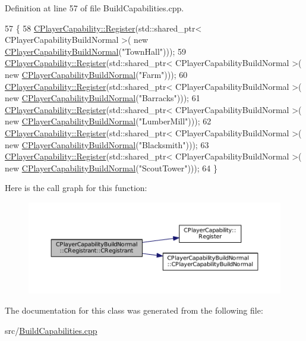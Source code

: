 Definition at line 57 of file Build\+Capabilities.\+cpp.


\begin{DoxyCode}
57                                                     \{
58     \hyperlink{classCPlayerCapability_a7e298018dcde2684451add3cfff065f7}{CPlayerCapability::Register}(std::shared\_ptr< CPlayerCapabilityBuildNormal >(\textcolor{keyword}{
      new} \hyperlink{classCPlayerCapabilityBuildNormal_a36157bf1a2875f0831b646dd2313a464}{CPlayerCapabilityBuildNormal}(\textcolor{stringliteral}{"TownHall"})));   
59     \hyperlink{classCPlayerCapability_a7e298018dcde2684451add3cfff065f7}{CPlayerCapability::Register}(std::shared\_ptr< CPlayerCapabilityBuildNormal >(\textcolor{keyword}{
      new} \hyperlink{classCPlayerCapabilityBuildNormal_a36157bf1a2875f0831b646dd2313a464}{CPlayerCapabilityBuildNormal}(\textcolor{stringliteral}{"Farm"})));
60     \hyperlink{classCPlayerCapability_a7e298018dcde2684451add3cfff065f7}{CPlayerCapability::Register}(std::shared\_ptr< CPlayerCapabilityBuildNormal >(\textcolor{keyword}{
      new} \hyperlink{classCPlayerCapabilityBuildNormal_a36157bf1a2875f0831b646dd2313a464}{CPlayerCapabilityBuildNormal}(\textcolor{stringliteral}{"Barracks"})));   
61     \hyperlink{classCPlayerCapability_a7e298018dcde2684451add3cfff065f7}{CPlayerCapability::Register}(std::shared\_ptr< CPlayerCapabilityBuildNormal >(\textcolor{keyword}{
      new} \hyperlink{classCPlayerCapabilityBuildNormal_a36157bf1a2875f0831b646dd2313a464}{CPlayerCapabilityBuildNormal}(\textcolor{stringliteral}{"LumberMill"})));
62     \hyperlink{classCPlayerCapability_a7e298018dcde2684451add3cfff065f7}{CPlayerCapability::Register}(std::shared\_ptr< CPlayerCapabilityBuildNormal >(\textcolor{keyword}{
      new} \hyperlink{classCPlayerCapabilityBuildNormal_a36157bf1a2875f0831b646dd2313a464}{CPlayerCapabilityBuildNormal}(\textcolor{stringliteral}{"Blacksmith"})));
63     \hyperlink{classCPlayerCapability_a7e298018dcde2684451add3cfff065f7}{CPlayerCapability::Register}(std::shared\_ptr< CPlayerCapabilityBuildNormal >(\textcolor{keyword}{
      new} \hyperlink{classCPlayerCapabilityBuildNormal_a36157bf1a2875f0831b646dd2313a464}{CPlayerCapabilityBuildNormal}(\textcolor{stringliteral}{"ScoutTower"})));
64 \}
\end{DoxyCode}
Here is the call graph for this function\+:
\nopagebreak
\begin{figure}[H]
\begin{center}
\leavevmode
\includegraphics[width=350pt]{classCPlayerCapabilityBuildNormal_1_1CRegistrant_af4a7b74e621f41f2ccbadccc7f9a5a57_cgraph}
\end{center}
\end{figure}


The documentation for this class was generated from the following file\+:\begin{DoxyCompactItemize}
\item 
src/\hyperlink{BuildCapabilities_8cpp}{Build\+Capabilities.\+cpp}\end{DoxyCompactItemize}

